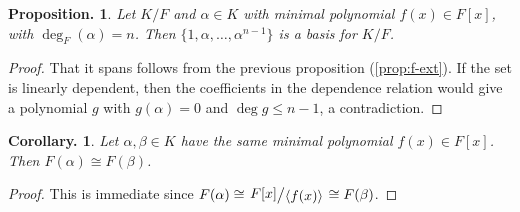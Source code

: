 \documentclass[11pt, a4paper]{memoir}
\theoremstyle{change}
\newtheorem{corollary}[theorem]{Corollary.}
\newtheorem{proposition}[theorem]{Proposition.}
\theoremstyle{plain}
\theoremstyle{nonumberplain}
\newtheorem{proof}{Proof}
\newcommand{\quot}[2]{\mathchoice{\left.\raisebox{0.14em}{$#1$}\middle/\raisebox{-0.14em}{$#2$}\right.}
                                 {\left.\raisebox{0.08em}{$#1$}\middle/\raisebox{-0.08em}{$#2$}\right.}
                                 {\left.\raisebox{0.03em}{$#1$}\middle/\raisebox{-0.03em}{$#2$}\right.}
                                 {\left.\raisebox{0em}{$#1$}\middle/\raisebox{0em}{$#2$}\right.}}
\numberwithin{equation}{section}
\begin{document}
\begin{proposition}
    Let $K/F$ and $\alpha\in K$ with minimal polynomial $f(x)\in F[x]$, with $\deg_F(\alpha)=n$.
    Then $\{1,\alpha,\ldots,\alpha^{n-1}\}$ is a basis for $K/F$.
\end{proposition}
\begin{proof}
    That it spans follows from the previous proposition (\cref{prop:f-ext}).
    If the set is linearly dependent, then the coefficients in the dependence relation would give a polynomial $g$ with $g(\alpha)=0$ and $\deg g\leq n-1$, a contradiction.
\end{proof}
\begin{corollary}
    Let $\alpha,\beta\in K$ have the same minimal polynomial $f(x)\in F[x]$.
    Then $F(\alpha)\cong F(\beta)$.
\end{corollary}
\begin{proof}
    This is immediate since $F(\alpha)\cong\quot{F[x]}{\langle f(x)\rangle}\cong F(\beta)$.
\end{proof}
\end{document}
